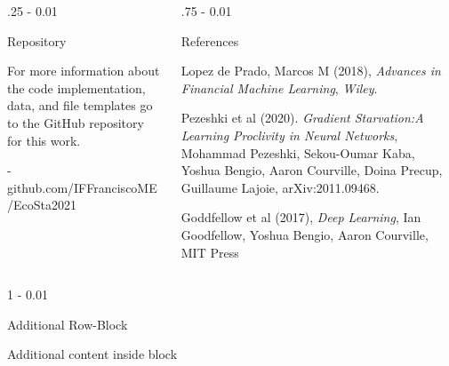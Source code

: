\documentclass{postertheme}\usepackage[]{graphicx}\usepackage[]{color}
\begin{document}
\begin{frame}
\begin{columns}[onlytextwidth]
  
  \begin{column}{.25 \textwidth - 0.01 \textwidth}
    \begin{block}{Repository}
        
        For more information about the code implementation, data, and file templates go to the GitHub
        repository for this work.
        
        - github.com/IFFranciscoME/EcoSta2021
        
    \end{block}
  \end{column}
  
  \begin{column}{.75 \textwidth - 0.01 \textwidth}
    \begin{block}{References}
    
    \begin{thebibliography}{02}
              Lopez de Prado, Marcos M (2018), \textit{Advances in Financial Machine Learning}, \emph{Wiley}.

               Pezeshki et al (2020). \textit{Gradient Starvation:A Learning Proclivity in Neural Networks},
               Mohammad Pezeshki, Sekou-Oumar Kaba, Yoshua Bengio, Aaron Courville, Doina Precup,
               Guillaume Lajoie, arXiv:2011.09468.
                                                     
               Goddfellow et al (2017), \textit{Deep Learning}, Ian Goodfellow, Yoshua Bengio,
               Aaron Courville, MIT Press
    \end{thebibliography}
    
    \end{block}
  \end{column}
\end{columns}


\begin{columns}[onlytextwidth]
  
  \begin{column}{1 \textwidth - 0.01 \textwidth}
    \begin{block}{Additional Row-Block}
        
      Additional content inside block
        
    \end{block}
  \end{column}
\end{columns}

\end{frame}
\end{document}
